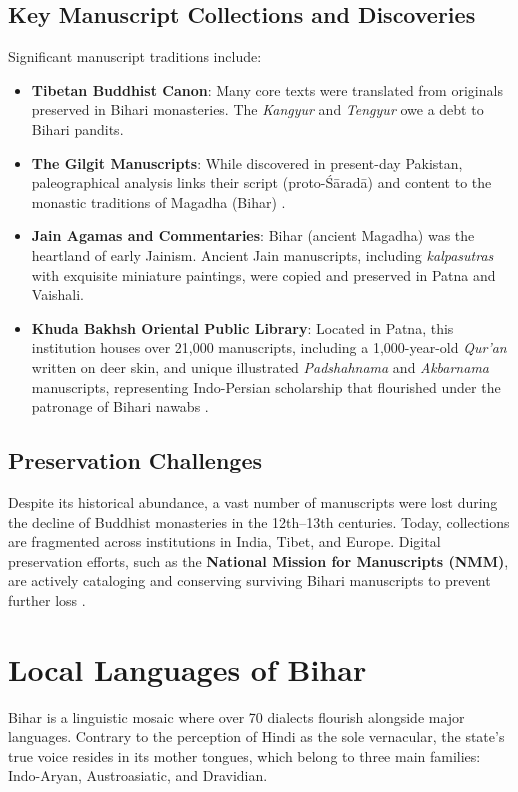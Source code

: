 \documentclass{article}
\begin{document}
\subsection{Key Manuscript Collections and Discoveries}
Significant manuscript traditions include:
\begin{itemize}[leftmargin=*]
    \item \textbf{Tibetan Buddhist Canon}: Many core texts were translated from originals preserved in Bihari monasteries. The \textit{Kangyur} and \textit{Tengyur} owe a debt to Bihari pandits.
    \item \textbf{The Gilgit Manuscripts}: While discovered in present-day Pakistan, paleographical analysis links their script (proto-Śāradā) and content to the monastic traditions of Magadha (Bihar) \cite{vira2009gilgit}.
    \item \textbf{Jain Agamas and Commentaries}: Bihar (ancient Magadha) was the heartland of early Jainism. Ancient Jain manuscripts, including \textit{kalpasutras} with exquisite miniature paintings, were copied and preserved in Patna and Vaishali.
    \item \textbf{Khuda Bakhsh Oriental Public Library}: Located in Patna, this institution houses over 21,000 manuscripts, including a 1,000-year-old \textit{Qur'an} written on deer skin, and unique illustrated \textit{Padshahnama} and \textit{Akbarnama} manuscripts, representing Indo-Persian scholarship that flourished under the patronage of Bihari nawabs \cite{khudabakhsh2020catalogue}.
\end{itemize}

\subsection{Preservation Challenges}
Despite its historical abundance, a vast number of manuscripts were lost during the decline of Buddhist monasteries in the 12th–13th centuries. Today, collections are fragmented across institutions in India, Tibet, and Europe. Digital preservation efforts, such as the \textbf{National Mission for Manuscripts (NMM)}, are actively cataloging and conserving surviving Bihari manuscripts to prevent further loss \cite{nmm2024report}.

\section{Local Languages of Bihar}
Bihar is a linguistic mosaic where over 70 dialects flourish alongside major languages. Contrary to the perception of Hindi as the sole vernacular, the state’s true voice resides in its mother tongues, which belong to three main families: Indo-Aryan, Austroasiatic, and Dravidian.
\end{document}
